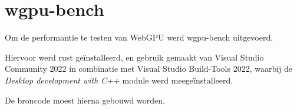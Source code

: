 \break

\section{wgpu-bench}

Om de performantie te testen van WebGPU werd wgpu-bench uitgevoerd.

Hiervoor werd rust geïnstalleerd, en gebruik gemaakt van Visual Studio Community 2022 in combinatie met Visual Studio Build-Tools 2022, waarbij de \textit{Desktop development with C++} module werd meegeïnstalleerd.

De broncode moest hierna gebouwd worden.


\break{}
